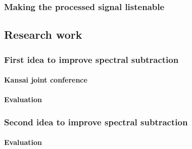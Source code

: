 \subsubsection{Making the processed signal listenable}
\subsection{Research work}
\subsubsection{First idea to improve spectral subtraction}
\paragraph{Kansai joint conference}
\paragraph{Evaluation}
\subsubsection{Second idea to improve spectral subtraction}
\paragraph{Evaluation}